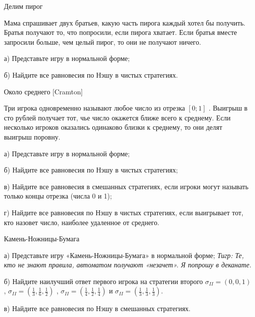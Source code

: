 \begin{problem}
 Делим пирог\par
Мама спрашивает двух братьев, какую часть пирога каждый хотел бы получить. Братья получают то, что попросили, если пирога хватает. Если братья вместе запросили больше, чем целый пирог, то они не получают ничего.\par
а)	Представьте игру в нормальной форме;\par
б)	Найдите все равновесия по Нэшу в чистых стратегиях.



\begin{sol}

\end{sol}
\end{problem}



\begin{problem}
 Около среднего [Cramton]\par
Три игрока одновременно называют любое число из отрезка  $\left[0;1\right]$ . Выигрыш в сто рублей получает тот, чье число окажется ближе всего к среднему. Если несколько игроков оказались одинаково близки к среднему, то они делят выигрыш поровну.\par
а)	Представьте игру в нормальной форме;\par
б)	Найдите все равновесия по Нэшу в чистых стратегиях;\par
в)	Найдите все равновесия в смешанных стратегиях, если игроки могут называть только концы отрезка (числа 0 и 1);\par
г)	Найдите все равновесия по Нэшу в чистых стратегиях, если выигрывает тот, кто назовет число, наиболее удаленное от среднего.



\begin{sol}

\end{sol}
\end{problem}



\begin{problem}
 Камень-Ножницы-Бумага\par
а)	Представьте игру «Камень-Ножницы-Бумага» в нормальной форме; {\it Тигр: Те, кто не знают правила, автоматом получают «незачет». Я попрошу в деканате.}\par
б)	Найдите наилучший ответ первого игрока на стратегии второго  $\sigma _{II} =\left(0,0,1\right)$ ,  $\sigma _{II} =\left(\frac{1}{3} ,\frac{1}{6} ,\frac{1}{2} \right)$ ,  $\sigma _{II} =\left(\frac{1}{4} ,\frac{1}{2} ,\frac{1}{4} \right)$  и  $\sigma _{II} =\left(\frac{1}{3} ,\frac{1}{3} ,\frac{1}{3} \right)$.\par
в)	Найдите все равновесия по Нэшу в смешанных стратегиях.



\begin{sol}

\end{sol}
\end{problem}



